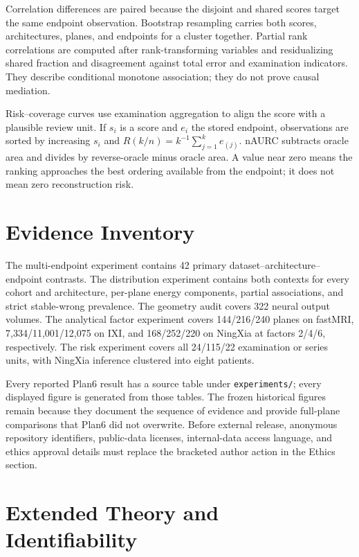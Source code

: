 \documentclass[journal,10pt]{IEEEtran}
\begin{document}
Correlation differences are paired because the disjoint and shared scores target the same endpoint observation. Bootstrap resampling carries both scores, architectures, planes, and endpoints for a cluster together. Partial rank correlations are computed after rank-transforming variables and residualizing shared fraction and disagreement against total error and examination indicators. They describe conditional monotone association; they do not prove causal mediation.

Risk--coverage curves use examination aggregation to align the score with a plausible review unit. If $s_i$ is a score and $e_i$ the stored endpoint, observations are sorted by increasing $s_i$ and $R(k/n)=k^{-1}\sum_{j=1}^k e_{(j)}$. nAURC subtracts oracle area and divides by reverse-oracle minus oracle area. A value near zero means the ranking approaches the best ordering available from the endpoint; it does not mean zero reconstruction risk.

\section{Evidence Inventory}
The multi-endpoint experiment contains 42 primary dataset--architecture--endpoint contrasts. The distribution experiment contains both contexts for every cohort and architecture, per-plane energy components, partial associations, and strict stable-wrong prevalence. The geometry audit covers 322 neural output volumes. The analytical factor experiment covers 144/216/240 planes on fastMRI, 7,334/11,001/12,075 on IXI, and 168/252/220 on NingXia at factors 2/4/6, respectively. The risk experiment covers all 24/115/22 examination or series units, with NingXia inference clustered into eight patients.

Every reported Plan6 result has a source table under \texttt{experiments/}; every displayed figure is generated from those tables. The frozen historical figures remain because they document the sequence of evidence and provide full-plane comparisons that Plan6 did not overwrite. Before external release, anonymous repository identifiers, public-data licenses, internal-data access language, and ethics approval details must replace the bracketed author action in the Ethics section.

\section{Extended Theory and Identifiability}
\end{document}
